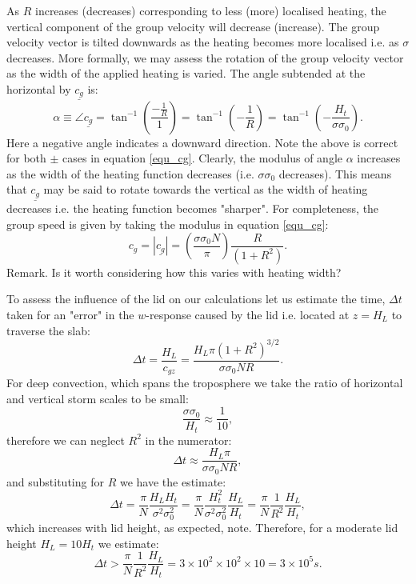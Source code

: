 \documentclass[12pt]{article}
\begin{document}
As $R$ increases (decreases) corresponding to less (more) localised heating, the vertical component of the group velocity will decrease (increase). 
The group velocity vector is tilted downwards as the heating becomes more localised i.e. as $\sigma$ decreases.
More formally, we may assess the rotation of the group velocity vector as the width of the applied heating is varied. 
The angle subtended at the horizontal by $\underline{c_g} $ is:
%
\begin{equation}
\alpha \equiv \angle \underline{c_g} = \tan^{-1} \left( \frac{-\frac{1}{R} }{ 1 } \right) = \tan^{-1} \left( - \frac{1}{R } \right) =  \tan^{-1} \left( - \frac{H_t}{ \sigma \sigma_0 } \right).
\end{equation}
%
Here a negative angle indicates a downward direction. Note the above is correct for both $\pm$ cases in equation \ref{equ_cg}. Clearly, 
the modulus of angle $\alpha$ increases as the width of the heating function decreases (i.e. $\sigma \sigma_0$ decreases). This means that 
$\underline{c_g} $ may be said to rotate towards the vertical as the width of heating decreases i.e. the heating function becomes "sharper".
For completeness, the group speed is given by taking the modulus in equation \ref{equ_cg}:
%
\begin{equation}
\label{equ_cg}
c_g = |\underline{c_g}| = \left( \frac{ \sigma \sigma_0 N }{\pi} \right)  \frac{ R}{(1 + R^2 ) }.
\end{equation}
%
Remark. Is it worth considering how this varies with heating width?
 
To assess the influence of the lid on our calculations let us estimate the time, $\Delta t $ taken for an "error" in the $w$-response caused by the lid i.e. located at $z=H_L$ to traverse the slab:
%
\begin{equation}
\label{equ_dt}
\Delta t = \frac{H_L}{c_{gz}} = \frac{ H_L \pi (1 + R^2 )^{3/2} } {\sigma \sigma_0 N R }. 
\end{equation}
%
For deep convection, which spans the troposphere we take the ratio of horizontal and vertical storm scales to be small:
%
\begin{equation}
\frac{\sigma \sigma_0}{ H_t} \approx \frac{1}{10},
\end{equation}
%
therefore we can neglect $R^2$ in the numerator:
%
\begin{equation}
\Delta t \approx \frac{H_L \pi}{ \sigma \sigma_0 N R },
\end{equation}
%
and substituting for $R$ we have the estimate:
%
\begin{equation}
\Delta t  = \frac{\pi}{N} \frac{H_L H_t}{ \sigma^2 \sigma^2_0} =  \frac{\pi}{N} \frac{H_t^2}{ \sigma^2 \sigma^2_0} \frac{H_L}{H_t} = \frac{\pi}{N} \frac{1}{R^2} \frac{H_L}{H_t},
\end{equation}
%
which increases with lid height, as expected,  note. Therefore, for a moderate lid height $H_L = 10 H_t$ we estimate:
%
\begin{equation}
\Delta t > \frac{\pi}{N} \frac{1}{R^2} \frac{H_L}{H_t} = 3 \times 10^2 \times 10^2 \times 10 = 3 \times 10^5 s.
\end{equation}
%
\end{document}
